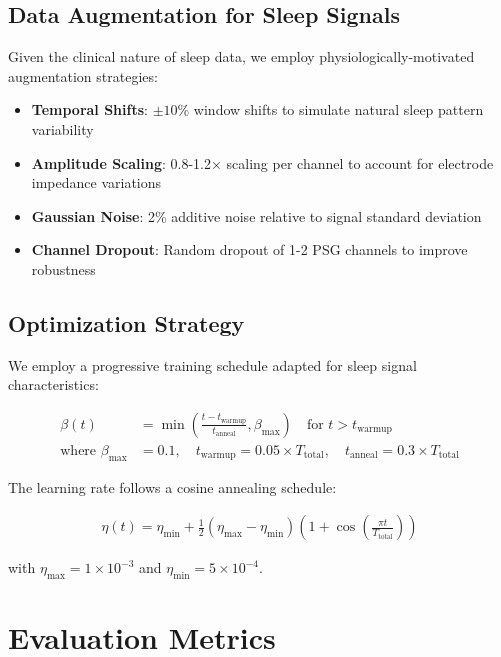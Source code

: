 \documentclass[11pt]{article}
\begin{document}
\subsection{Data Augmentation for Sleep Signals}

Given the clinical nature of sleep data, we employ physiologically-motivated augmentation strategies:

\begin{itemize}
    \item \textbf{Temporal Shifts}: $\pm 10\%$ window shifts to simulate natural sleep pattern variability
    \item \textbf{Amplitude Scaling}: 0.8-1.2× scaling per channel to account for electrode impedance variations
    \item \textbf{Gaussian Noise}: 2\% additive noise relative to signal standard deviation
    \item \textbf{Channel Dropout}: Random dropout of 1-2 PSG channels to improve robustness
\end{itemize}

\subsection{Optimization Strategy}

We employ a progressive training schedule adapted for sleep signal characteristics:

\begin{align}
\beta(t) &= \min\left(\frac{t - t_{\text{warmup}}}{t_{\text{anneal}}}, \beta_{\text{max}}\right) \quad \text{for } t > t_{\text{warmup}} \\
\text{where } \beta_{\text{max}} &= 0.1, \quad t_{\text{warmup}} = 0.05 \times T_{\text{total}}, \quad t_{\text{anneal}} = 0.3 \times T_{\text{total}}
\end{align}

The learning rate follows a cosine annealing schedule:

\begin{align}
\eta(t) = \eta_{\text{min}} + \frac{1}{2}(\eta_{\text{max}} - \eta_{\text{min}})\left(1 + \cos\left(\frac{\pi t}{T_{\text{total}}}\right)\right)
\end{align}

with $\eta_{\text{max}} = 1 \times 10^{-3}$ and $\eta_{\text{min}} = 5 \times 10^{-4}$.

\section{Evaluation Metrics}
\end{document}
